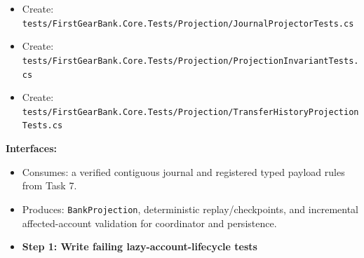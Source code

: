 \documentclass[
  10pt,
  letterpaper,
]{article}
\newcommand{\passthrough}[1]{#1}
\providecommand{\tightlist}{%
  \setlength{\itemsep}{0pt}\setlength{\parskip}{0pt}}
\begin{document}
\begin{itemize}
\item
  Create:
  \texttt{tests/}\allowbreak{}\texttt{FirstGearBank.}\allowbreak{}\texttt{Core.}\allowbreak{}\texttt{Tests/}\allowbreak{}\texttt{Projection/}\allowbreak{}\texttt{JournalProjectorTests.}\allowbreak{}\texttt{cs}
\item
  Create:
  \texttt{tests/}\allowbreak{}\texttt{FirstGearBank.}\allowbreak{}\texttt{Core.}\allowbreak{}\texttt{Tests/}\allowbreak{}\texttt{Projection/}\allowbreak{}\texttt{ProjectionInvariantTests.}\allowbreak{}\texttt{cs}
\item
  Create:
  \texttt{tests/}\allowbreak{}\texttt{FirstGearBank.}\allowbreak{}\texttt{Core.}\allowbreak{}\texttt{Tests/}\allowbreak{}\texttt{Projection/}\allowbreak{}\texttt{TransferHistoryProjectionTests.}\allowbreak{}\texttt{cs}
\end{itemize}

\textbf{Interfaces:}

\begin{itemize}
\tightlist
\item
  Consumes: a verified contiguous journal and registered typed payload
  rules from Task 7.
\item
  Produces: \passthrough{\lstinline!BankProjection!}, deterministic
  replay/checkpoints, and incremental affected-account validation for
  coordinator and persistence.
\end{itemize}

\begin{itemize}
\tightlist
\item[$\square$]
  \textbf{Step 1: Write failing lazy-account-lifecycle tests}
\end{itemize}
\end{document}
